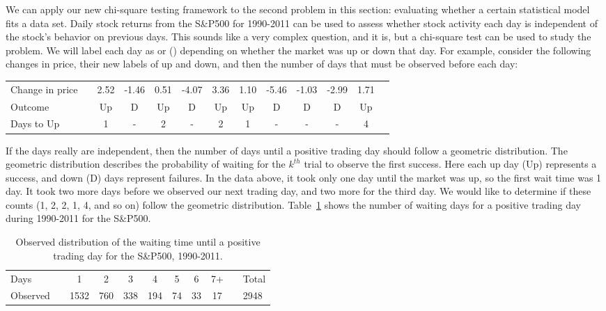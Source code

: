 We can apply our new chi-square testing framework to the second problem in this section: evaluating whether a certain statistical model fits a data set. Daily stock returns from the S\&P500 for 1990-2011 can be used to assess whether stock activity each day is independent of the stock's behavior on previous days. This sounds like a very complex question, and it is, but a chi-square test can be used to study the problem. We will label each day as  or  () depending on whether the market was up or down that day. For example, consider the following changes in price, their new labels of up and down, and then the number of days that must be observed before each  day:
\begin{center}\footnotesize
\begin{tabular}{lc ccc ccc ccc cc}
Change in price		&\hspace{-1mm}	& \footnotesize2.52 &
	\footnotesize-1.46 & \footnotesize 0.51 &
	\footnotesize-4.07 & \footnotesize3.36 &
	\footnotesize1.10 &
	\footnotesize-5.46 & \footnotesize-1.03 & \footnotesize-2.99 & \footnotesize1.71 \\
Outcome	 & \hspace{-1mm} &
	Up &
	D & Up &
	D & Up &
	Up &
	D & D & D & Up \\
\footnotesize Days to Up & \hspace{-1mm} & 1 & - & 2 & - & 2 & 1 & - & - & - & 4 \\
\end{tabular}
\end{center}
If the days really are independent, then the number of days until a positive trading day should follow a geometric distribution. The geometric distribution describes the probability of waiting for the $k^{th}$ trial to observe the first success. Here each up day (Up) represents a success, and down (D) days represent failures. In the data above, it took only one day until the market was up, so the first wait time was 1 day. It took two more days before we observed our next  trading day, and two more for the third  day. We would like to determine if these counts (1, 2, 2, 1, 4, and so on) follow the geometric distribution. Table~\ref{sAndP500For1990To2011TimeToPosTrade} shows the number of waiting days for a positive trading day during 1990-2011 for the S\&P500.

\begin{table}[h]
\centering
\begin{tabular}{ll ccc ccc c ll}
\hline
Days	 & \hspace{2mm} & 1 & 2 & 3 & 4 & 5 & 6 & 7+ & \hspace{2mm} & Total \\
Observed &		& 1532 & 760 & 338 & 194 & 74 & 33 & 17 & & 2948 \\
\hline
\end{tabular}
\caption{Observed distribution of the waiting time until a positive trading day for the S\&P500, 1990-2011.}
\label{sAndP500For1990To2011TimeToPosTrade}
\end{table}

